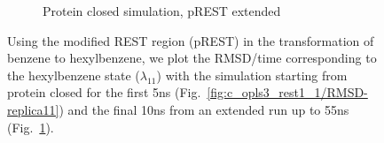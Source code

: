 \begin{figure}[!ht]
\begin{subfigure}{\textwidth}
   \caption{Protein closed simulation, pREST extended}
   \label{fig:c_opls3_rest1_1/45-55ns/RMSD-replica11}
\end{subfigure}%
\caption{Using the modified REST region (pREST) in the transformation of benzene to hexylbenzene, we plot the RMSD/time corresponding to the hexylbenzene state ($\lambda_{11}$) with the simulation starting from protein closed for the first 5ns (Fig.~\ref{fig:c_opls3_rest1_1/RMSD-replica11}) and the final 10ns from an extended run up to 55ns (Fig.~\ref{fig:c_opls3_rest1_1/45-55ns/RMSD-replica11}).}
\label{fig:benzene_to_n-hexyl_pREST}
\end{figure}





